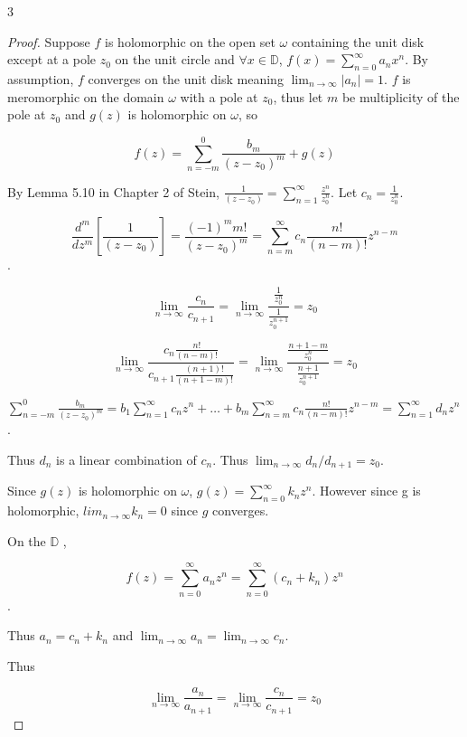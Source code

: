\documentclass{article}
\begin{document}
\begin{PROB}{3}\label{Problem 3.}
\end{PROB}
\begin{proof}
    Suppose $f$ is holomorphic on the open set $\omega$ containing the unit disk except at a pole $z_0$ on the unit circle and $\forall x \in \mathbb{D}$, $f(x) = \sum_{n = 0}^{\infty} a_n x^n$. By assumption, $f$ converges on the unit disk meaning $\lim_{n \to \infty}|a_n|  = 1$. $f$ is meromorphic on the domain $\omega$ with a pole at $z_0$, thus let $m$ be multiplicity of the pole at $z_0$ and $g(z)$ is holomorphic on $\omega$, so    
    
    \[
        f(z) = \sum_{n = -m}^{0} \frac{b_m}{(z - z_0)^m} + g(z) 
    \]

    By Lemma 5.10 in Chapter 2 of Stein, $\frac{1}{(z- z_0)} = \sum_{n = 1}^{\infty} \frac{z^n}{z_0^n}$. Let $c_n = \frac{1}{z_0^n}$.  
    
    \[
        \frac{d^m}{dz^m}\left[\frac{1}{(z- z_0)}\right] = \frac{(-1)^m m!}{(z - z_0)^m} = \sum_{n=m}^{\infty} c_n \frac{n!}{(n - m)!} z^{n - m}  
    \].

    \[
        \lim_{n \to \infty} \frac{c_n}{c_{n + 1}} = \lim_{n \to \infty} \frac{\frac{1}{z_0^n}}{\frac{1}{z_0^{n+1}}} = z_0
    \]

    \[
        \lim_{n \to \infty} \frac{c_n \frac{n!}{(n - m)!}}{c_{n + 1} \frac{(n+1)!}{(n + 1 - m)!}} = \lim_{n \to \infty} \frac{\frac{n + 1 - m}{z_0^n}}{\frac{n + 1}{z_0^{n+1}}} = z_0
    \]

    $\sum_{n = -m}^{0} \frac{b_m}{(z - z_0)^m} = b_1\sum_{n = 1}^{\infty} c_n z^n + \dots + b_m\sum_{n=m}^{\infty} c_n \frac{n!}{(n - m)!} z^{n - m} = \sum_{n = 1}^{\infty} d_n z^n$. 

    Thus $d_n$ is a linear combination of $c_n$. Thus $\lim_{n \to \infty} d_n / d_{n + 1} = z_0$. 
    
    
    Since $g(z)$ is holomorphic on $\omega$, $g(z) = \sum_{n = 0}^{\infty}k_n z^n$. However since g is holomorphic, $lim_{n \to \infty} k_n = 0$ since $g$ converges.   
    
    On the $\mathbb{D}$ , 
    
    \[
        f(z) = \sum_{n = 0}^{\infty} a_n z^n = \sum_{n = 0}^{\infty}(c_n + k_n) z^n 
    \].

    Thus $a_n = c_n + k_n$ and  $\lim_{n \to \infty} a_n = \lim_{n \to \infty} c_n$. 
    
    Thus 
    
    \[
        \lim_{n \to \infty} \frac{a_n}{a_{n + 1}} = \lim_{n \to \infty} \frac{c_n}{c_{n + 1}} = z_0
    \]
\end{proof}
\end{document}
